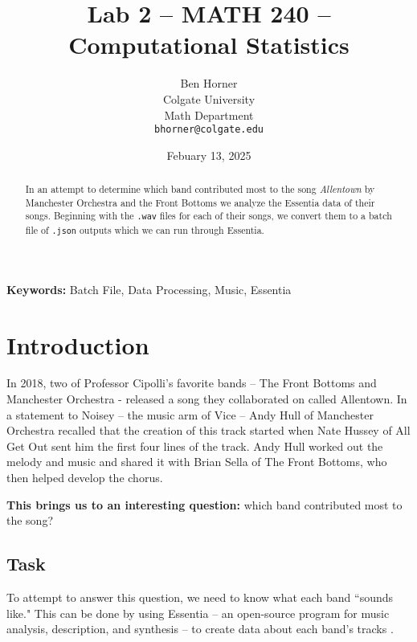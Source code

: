 \documentclass{article}\usepackage[]{graphicx}\usepackage[]{xcolor}
\begin{document}
\vspace{-1in}
\title{Lab 2 -- MATH 240 -- Computational Statistics}

\author{
  Ben Horner \\
  Colgate University  \\
  Math Department  \\
  {\tt bhorner@colgate.edu}
}

\date{Febuary 13, 2025}

\maketitle

\begin{multicols}{2}
\begin{abstract}
In an attempt to determine which band contributed most to the song \emph{Allentown} by Manchester Orchestra and the Front Bottoms we analyze the Essentia data of their songs. Beginning with the \texttt{.wav} files for each of their songs, we convert them to a batch file of \texttt{.json} outputs which we can run through Essentia. 

\end{abstract}

\noindent \textbf{Keywords:} Batch File, Data Processing, Music, Essentia

\section{Introduction}
  In 2018, two of Professor Cipolli's favorite bands -- The Front Bottoms and Manchester Orchestra - released a song they collaborated on called Allentown. In a statement to Noisey --  the music arm of Vice -- Andy Hull of Manchester Orchestra recalled that the creation of this track started when Nate Hussey of All Get Out sent him the first four lines of the track. Andy Hull worked out the melody and music and shared it with Brian Sella of The Front Bottoms, who then helped develop the chorus.

\textbf{This brings us to an interesting question:} which band contributed most to the song?
 
 
\subsection{Task}
  To attempt to answer this question, we need to know what each band ``sounds like." This can be done by using Essentia -- an open-source program for music analysis, description, and synthesis -- to create data about each band's tracks \citep{Essentia}. 
  

\end{multicols}
\end{document}

